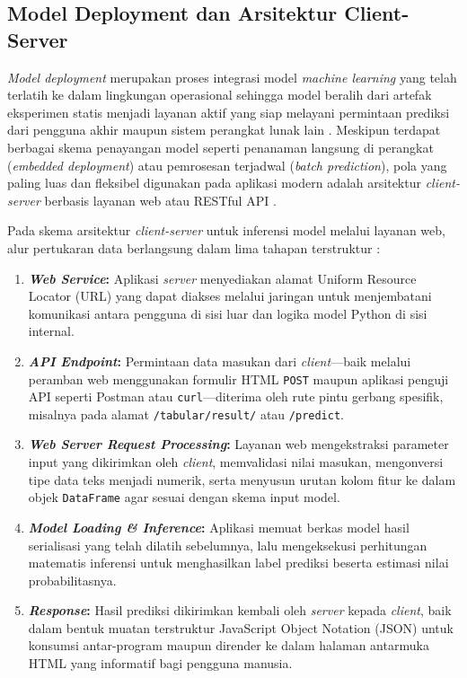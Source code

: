 \documentclass[a4paper,oneside,11pt]{book}
\begin{document}
\subsection{Model Deployment dan Arsitektur Client-Server}
\par \textit{Model deployment} merupakan proses integrasi model \textit{machine learning} yang telah terlatih ke dalam lingkungan operasional sehingga model beralih dari artefak eksperimen statis menjadi layanan aktif yang siap melayani permintaan prediksi dari pengguna akhir maupun sistem perangkat lunak lain \cite{huyen2022designing, kreuzberger2023mlops}. Meskipun terdapat berbagai skema penayangan model seperti penanaman langsung di perangkat (\textit{embedded deployment}) atau pemrosesan terjadwal (\textit{batch prediction}), pola yang paling luas dan fleksibel digunakan pada aplikasi modern adalah arsitektur \textit{client-server} berbasis layanan web atau RESTful API \cite{fielding2000architectural, huyen2022designing}.
\par Pada skema arsitektur \textit{client-server} untuk inferensi model melalui layanan web, alur pertukaran data berlangsung dalam lima tahapan terstruktur \cite{grinberg2018flask, huyen2022designing}:
\begin{enumerate}[label=\arabic*.]
  \item \textbf{\textit{Web Service}:} Aplikasi \textit{server} menyediakan alamat Uniform Resource Locator (URL) yang dapat diakses melalui jaringan untuk menjembatani komunikasi antara pengguna di sisi luar dan logika model Python di sisi internal.
  \item \textbf{\textit{API Endpoint}:} Permintaan data masukan dari \textit{client}---baik melalui peramban web menggunakan formulir HTML \texttt{POST} maupun aplikasi penguji API seperti Postman atau \texttt{curl}---diterima oleh rute pintu gerbang spesifik, misalnya pada alamat \texttt{/tabular/result/} atau \texttt{/predict}.
  \item \textbf{\textit{Web Server Request Processing}:} Layanan web mengekstraksi parameter input yang dikirimkan oleh \textit{client}, memvalidasi nilai masukan, mengonversi tipe data teks menjadi numerik, serta menyusun urutan kolom fitur ke dalam objek \texttt{DataFrame} agar sesuai dengan skema input model.
  \item \textbf{\textit{Model Loading \& Inference}:} Aplikasi memuat berkas model hasil serialisasi yang telah dilatih sebelumnya, lalu mengeksekusi perhitungan matematis inferensi untuk menghasilkan label prediksi beserta estimasi nilai probabilitasnya.
  \item \textbf{\textit{Response}:} Hasil prediksi dikirimkan kembali oleh \textit{server} kepada \textit{client}, baik dalam bentuk muatan terstruktur JavaScript Object Notation (JSON) untuk konsumsi antar-program maupun dirender ke dalam halaman antarmuka HTML yang informatif bagi pengguna manusia.
\end{enumerate}
\end{document}
